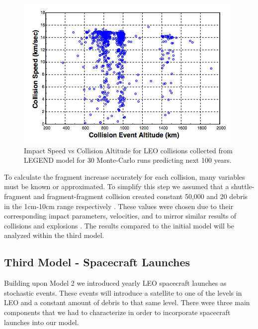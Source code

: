 \documentclass[pre,12pt]{revtex4-1}
\begin{document}
\begin{figure}[h!]
	\includegraphics[width=.5\textwidth]{"Figures/CollisionAlt"}
	\caption{Impact Speed vs Collision Altitude for LEO collisions collected from LEGEND model for 30 Monte-Carlo runs predicting next 100 years\citep{CollisionProbs}.}
	\label{fig:CollisionAlt}
\end{figure}


To calculate the fragment increase accurately for each collision, many variables must be known or approximated. To simplify this step we assumed that a shuttle-fragment and fragment-fragment collision created constant 50,000 and 20 debris in the 1cm-10cm range respectively \cite{PhippsSpaceLaserNudge}. These values were chosen due to their corresponding impact parameters, velocities, and to mirror similar results of collisions and explosions \citep{CollisionProbs2} \citep{Explosion1}. The results compared to the initial model will be analyzed within the third model.

\subsection{Third Model - Spacecraft Launches}

Building upon Model 2 we introduced yearly LEO spacecraft launches as stochastic events. These events will introduce a satellite to one of the levels in LEO and a constant amount of debris to that same level. There were three main components that we had to characterize in order to incorporate spacecraft launches into our model.\\
\end{document}

